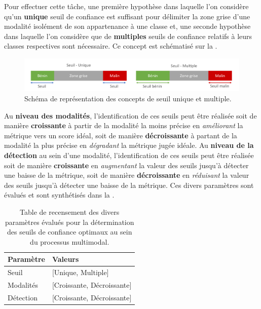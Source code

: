 Pour effectuer cette tâche, une première hypothèse dans laquelle l'on considère qu'un \textbf{unique} seuil de confiance est suffisant pour délimiter la zone grise d'une modalité isolément de son appartenance à une classe et, une seconde hypothèse dans laquelle l'on considère que de \textbf{multiples} seuils de confiance relatifs à leurs classes respectives sont nécessaire. Ce concept est schématisé sur la .\par

\begin{figure}[H]
    \centering
    \includegraphics[width=\linewidth]{contents/chapter_8/resources/scheme_multimodal_treshold.pdf}
    \caption{Schéma de représentation des concepts de seuil unique et multiple.}
    \label{fig:scheme_multimodal_treshold}
\end{figure}\par

Au \textbf{niveau des modalités}, l'identification de ces seuils peut être réalisée soit de manière \textbf{croissante} à partir de la modalité la moins précise en \textit{améliorant} la métrique vers un score idéal, soit de manière \textbf{décroissante} à partant de la modalité la plus précise en \textit{dégradant} la métrique jugée idéale. Au \textbf{niveau de la détection} au sein d'une modalité, l'identification de ces seuils peut être réalisée soit de manière \textbf{croissante} en \textit{augmentant} la valeur des seuils jusqu'à détecter une baisse de la métrique, soit de manière \textbf{décroissante} en \textit{réduisant} la valeur des seuils jusqu'à détecter une baisse de la métrique. Ces divers paramètres sont évalués et sont synthétisés dans la .\par

\begin{table}[H]
    \centering
    \begin{tabular}{ll}
        \toprule 
        Paramètre                   & Valeurs                   \\ \midrule
        Seuil                       & [Unique, Multiple]        \\ \midrule
        Modalités                   & [Croissante, Décroissante]\\ \midrule
        Détection                   & [Croissante, Décroissante]\\ \bottomrule
    \end{tabular}
    \caption{Table de recensement des divers paramètres évalués pour la détermination des seuils de confiance optimaux au sein du processus multimodal.}
    \label{tab:multimodal_confidence_model_values}
\end{table}
 
